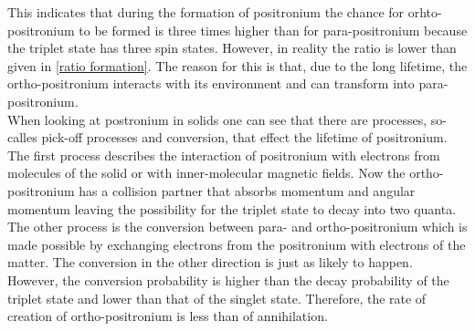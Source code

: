 This indicates that during the formation of positronium the chance for orhto-positronium to be formed is three times higher than for para-positronium because the triplet state has three spin states. However, in reality the ratio is lower than given in \ref{ratio formation}. The reason for this is that, due to the long lifetime, the ortho-positronium interacts with its environment and can transform into para-positronium.\\
When looking at postronium in solids one can see that there are processes, so-calles pick-off processes and conversion, that effect the lifetime of positronium. The first process describes the interaction of positronium with electrons from molecules of the solid or with inner-molecular magnetic fields. Now the ortho-positronium has a collision partner that absorbs momentum and angular momentum leaving the possibility for the triplet state to decay into two quanta. The other process is the conversion between para- and ortho-positronium which is made possible by exchanging electrons from the positronium with electrons of the matter. The conversion in the other direction is just as likely to happen. However, the conversion probability is higher than the decay probability of the triplet state and lower than that of the singlet state. Therefore, the rate of creation of ortho-positronium is less than of annihilation. 
